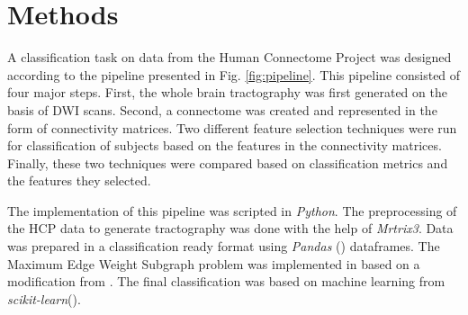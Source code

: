 \documentclass[msthesis.tex]{subfiles}
\begin{document}
\chapter{Methods}

A classification task  on data from the Human Connectome Project was designed according to the pipeline presented in Fig. \ref{fig:pipeline}.  This pipeline consisted of four major steps. First, the whole brain tractography was first generated on the basis of DWI scans. Second,  a connectome was created and represented in the form of connectivity matrices. Two different feature selection techniques were run for classification of subjects based on the features in the connectivity matrices. Finally, these two techniques were compared based on classification metrics and the features they selected. 

The implementation of this pipeline was scripted in \textit{Python}. The preprocessing of the HCP data to generate tractography was done with the help of \textit{Mrtrix3}.  Data was prepared in a classification ready format using \textit{Pandas} (\cite{pandas_2020}) dataframes. The Maximum Edge Weight Subgraph problem was implemented in  based on a modification from \cite{DBLP:journals/corr/LobodaAS16}. The final classification was based on machine learning from \textit{scikit-learn}(\cite{sklearn_2012}). 
\end{document}
